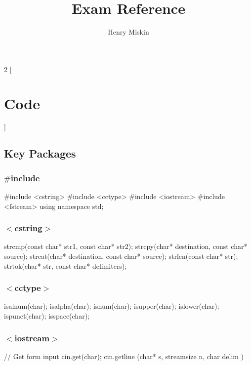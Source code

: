 \documentclass[10pt,a4paper]{extarticle}
\begin{document}
\title{Exam Reference}
\author{Henry Miskin}

\fancyhf{}
\renewcommand{\headrulewidth}{0pt}
\cfoot{\thepage}
\rfoot{\today}



\begin{multicols}{2}
[\section*{Code}]
\subsection*{Key Packages}

\subsubsection*{$\#$include}
\begin{cppcode}
  #include <cstring>
  #include <cctype>
  #include <iostream>
  #include <fstream>
  using namespace std;  
\end{cppcode}

\subsubsection*{\color{airforceblue}$<$cstring$>$}
\begin{cppcode}
  strcmp(const char* str1, const char* str2);
  strcpy(char* destination, const char* source);
  strcat(char* destination, const char* source);
  strlen(const char* str);
  strtok(char* str, const char* delimiters);
\end{cppcode}

\subsubsection*{\color{airforceblue}$<$cctype$>$}
\begin{cppcode}
  isalnum(char);
  isalpha(char);
  isnum(char);
  isupper(char);
  islower(char);
  ispunct(char);
  isspace(char);
\end{cppcode}

\subsubsection*{\color{airforceblue}$<$iostream$>$}
\begin{cppcode}
  // Get form input
  cin.get(char);
  cin.getline (char* s, streamsize n, char delim )


\end{cppcode}
\end{multicols}
\end{document}
